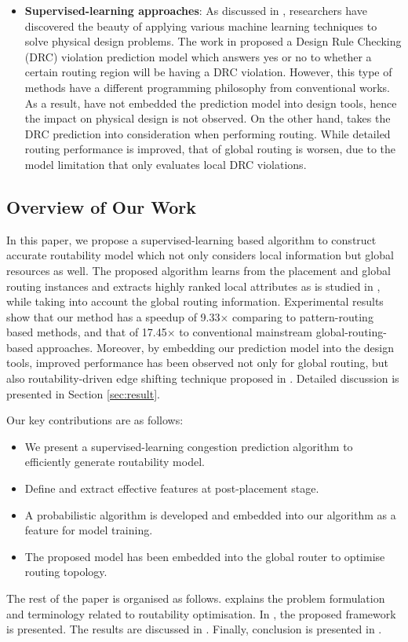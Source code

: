 \begin{itemize}
\item \textbf{Supervised-learning approaches}: As discussed in \cite{mlinphysicaldesign}, researchers have discovered the beauty of applying various machine learning techniques to solve physical design problems. The work in \cite{drcpredict18} proposed a Design Rule Checking (DRC) violation prediction model which answers yes or no to whether a certain routing region will be having a DRC violation. However, this type of methods have a different programming philosophy from conventional works. As a result, \cite{drcpredict18,drcDAT18} have not embedded the prediction model into design tools, hence the impact on physical design is not observed. On the other hand, \cite{drcingr} takes the DRC prediction into consideration when performing routing. While detailed routing performance is improved, that of global routing is worsen, due to the model limitation that only evaluates local DRC violations.
\end{itemize}


\subsection{Overview of Our Work}
In this paper, we propose a supervised-learning based algorithm to construct accurate routability model which not only considers local information but global resources as well.
The proposed algorithm learns from the placement and global routing instances and extracts highly ranked local attributes as is studied in \cite{parameterstudy}, while taking into account the global routing information.
Experimental results show that our method has a speedup of 9.33$\times$ comparing to pattern-routing based methods, and that of 17.45$\times$ to conventional mainstream global-routing-based approaches.
Moreover, by embedding our prediction model into the design tools, improved performance has been observed not only for global routing, but also routability-driven edge shifting technique proposed in \cite{fastroute}.
Detailed discussion is presented in Section \ref{sec:result}. 

Our key contributions are as follows:
\begin{itemize}
\item We present a supervised-learning congestion prediction algorithm to efficiently generate routability model.
\item Define and extract effective features at post-placement stage.
\item A probabilistic algorithm is developed and embedded into our algorithm as a feature for model training.
\item The proposed model has been embedded into the global router to optimise routing topology.
\end{itemize}

The rest of the paper is organised as follows.
 explains the problem formulation and terminology related to routability optimisation.
In , the proposed framework is presented.
The results are discussed in . Finally, conclusion is presented in .

